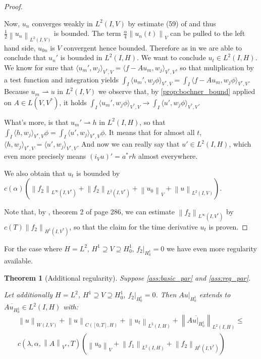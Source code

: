 \documentclass[english,a4paper,9pt,oneside]{scrbook}	%
\theoremstyle{break}
\newtheorem{thm}[equation]{Theorem}
\newenvironment{mproof}[1][\proofname]{%
  \begin{proof}[#1]$ $\par\nobreak\ignorespaces
}{%
  \end{proof}
}
\renewcommand*{\proofname}{Proof}
\theoremstyle{remark}
\newcommand{\norm}[1]{\left\lVert#1\right\rVert}
\newcommand{\VN}[1]{\norm{#1}_{V}}
\newcommand{\VSN}[1]{\norm{#1}_{V^*}}
\begin{document}
\begin{appendices}
\begin{mproof}
Now, $u_n$ converges weakly in $L^2(I,V)$ by estimate (59) of \cite{gilardi} and thus $\frac{1}{2}\norm{u_n}_{L^2(I,V)}$ is bounded. The term $\frac{\alpha}{4}\VN{u_n(t)}$ can be pulled to the left hand side, $u_{0n}$ is $V$ convergent hence bounded. Therefore as in \cite{gilardi} we are able to conclude that $u_n'$ is bounded in $L^2(I,H)$. We want to conclude $u_t \in L^2(I,H)$. We know for sure that $\langle u_m',w_j\rangle_{V^*,V}=\langle f-Au_m,w_j\rangle_{V^*,V}$, so that muliplication by a test function and integration yields $\int_I \langle u_m',w_j\phi\rangle_{V^*,V}=\int_I \langle f-Au_m,w_j\phi\rangle_{V^*,V}$. Because $u_m\rightharpoonup u$ in $L^2(I,V)$ we observe that, by \cref{prop:bochner_bound} applied on $A \in L(V,V^*)$, it holds $\int_I \langle u_m',w_j\phi\rangle_{V^*,V}\rightarrow \int_I \langle u',w_j\phi\rangle_{V^*,V}$.

What's more, is that $u_m' \rightharpoonup h$ in $L^2(I,H)$, so that $\int_I \langle h ,w_j\rangle_{V^*,V}\phi = \int_I \langle u',w_j\rangle_{V^*,V}\phi$. It means that for almost all $t$, $\langle h ,w_j\rangle_{V^*,V} = \langle u',w_j\rangle_{V^*,V}$. And now we can really say that $u' \in L^2(I,H)$, which even more precisely means $(i_Vu)' = a^* r h$ almost everywhere.

We also obtain that $u_t$ is bounded by $c(\alpha)(\norm{f_2}_{L^\infty(I,V^*)}+\norm{f_2}_{L^2(I,V^*)}+\VN{u_0}+\norm{u}_{L^2(I,V)})$.

Note that, by \cite{evans}, theorem 2 of page 286, we can estimate $\norm{f_2}_{L^\infty(I,V^*)}$ by $c(T)\norm{f_2}_{H^1(I,V^*)}$, so that the claim for the time derivative $u_t$ is proven.

\end{mproof}

For the case where $H=L^2$, $H^1\supseteq V\supseteq H^1_0$,  $f_2|_{H^1_0}=0$ we have even more regularity available.

\begin{thm}[Additional regularity]
\label{thm:par_reg}
Suppose \cref{ass:basic_par} and \cref{ass:reg_par}. 

Let additionally $H=L^2$, $H^1\supseteq V\supseteq H^1_0$,  $f_2|_{H^1_0}=0$. Then $Au|_{H^1_0}$ extends to $\overline{Au_{H^1_0}} \in L^2(I,H)$ with:
\begin{align}
	\norm{u}_{W(I,V)} + \norm{u}_{C([0,T],H)} + \norm{u_t}_{L^2(I,H)} +\norm{\overline{Au|_{H^1_0}}}_{L^2(I,H)}\leq\\ c(\lambda, \alpha, \VSN{A}, T)(\VN{u_0}+\norm{f_1}_{L^2(I,H)} + \norm{f_2}_{H^1(I,V^*)})
\end{align}


\end{thm}
\end{appendices}
\end{document}
